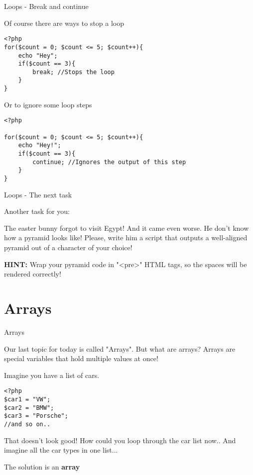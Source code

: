 \begin{frame}[fragile]{Loops - Break and continue}

Of course there are ways to stop a loop\pause

\begin{lstlisting}
<?php
for($count = 0; $count <= 5; $count++){
	echo "Hey";
	if($count == 3){
		break; //Stops the loop
	}
}
\end{lstlisting} \pause

Or to ignore some loop steps \pause

\begin{lstlisting}
<?php

for($count = 0; $count <= 5; $count++){
	echo "Hey!";
	if($count == 3){
		continue; //Ignores the output of this step
	}
}
\end{lstlisting} \pause

\end{frame}

\begin{frame}[fragile]{Loops - The next task}

Another task for you:

The easter bunny forgot to visit Egypt! And it came even worse. He don't know how a pyramid looks like! Please, write him a script that outputs a well-aligned pyramid out of a character of your choice! \pause

\textbf{HINT:} Wrap your pyramid code in "\textless{}pre\textgreater{}" HTML tags, so the spaces will be rendered correctly!

\end{frame}

\section{Arrays}

\begin{frame}[fragile]{Arrays}

Our last topic for today is called "Arrays". But what are arrays? \pause
Arrays are special variables that hold multiple values at once!

Imagine you have a list of cars.
\begin{lstlisting}
<?php
$car1 = "VW";
$car2 = "BMW";
$car3 = "Porsche";
//and so on..
\end{lstlisting} \pause

That doesn't look good! How could you loop through the car list now.. And imagine all the car types in one list... \pause

The solution is an \textbf{array}

\end{frame}


